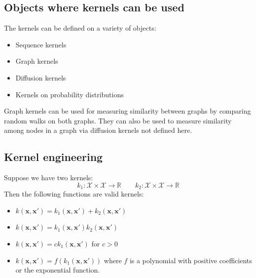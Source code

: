 \documentclass[a4paper,10pt,twoside]{article}
\begin{document}
\subsection{Objects where kernels can be used}
The kernels can be defined on a variety of objects:
\begin{itemize}
    \item Sequence kernels
    \item Graph kernels
    \item Diffusion kernels
    \item Kernels on probability distributions
\end{itemize}

Graph kernels can be used for measuring similarity between graphs by comparing random walks on both graphs. They can also be used to measure similarity among nodes in a graph via diffusion kernels not defined here.

\subsection{Kernel engineering}

Suppose we have two kernels:
\begin{equation*}
    k_1:\mathcal{X}\times \mathcal{X}\rightarrow \mathbb{R}\qquad k_2:\mathcal{X}\times \mathcal{X}\rightarrow \mathbb{R}
\end{equation*}
Then the following functions are valid kernels:
\begin{itemize}
    \item $k(\mathbf{x}, \mathbf{x}')=k_1(\mathbf{x}, \mathbf{x}')+k_2(\mathbf{x}, \mathbf{x}')$
    \item $k(\mathbf{x}, \mathbf{x}')=k_1(\mathbf{x}, \mathbf{x}')k_2(\mathbf{x}, \mathbf{x}')$
    \item $k(\mathbf{x}, \mathbf{x}')=ck_1(\mathbf{x}, \mathbf{x}')$ for $c>0$
    \item $k(\mathbf{x}, \mathbf{x}')=f(k_1(\mathbf{x}, \mathbf{x}'))$ where $f$ is a polynomial with positive coefficients or the exponential function.
\end{itemize}
\end{document}
